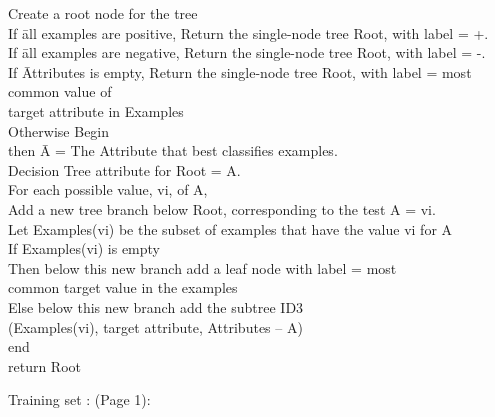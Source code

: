 \documentclass{report}
\begin{document}
\begin{tabbing}
Create a root node for the tree\\
If \= all examples are positive, Return the single-node tree Root, with label = +.\\
If \= all examples are negative, Return the single-node tree Root, with label = -.\\
If \= Attributes is empty, Return the single-node tree Root, with label = most common value of\\ target attribute in Examples\\
Otherwise Begin \\
\> then \=  A = The Attribute that best classifies examples.\\
\> Decision Tree attribute for Root = A.\\
\> For each possible value, vi, of A,\\
\> \> Add a new tree branch below Root, corresponding to the test A = vi.\\
\> \> Let Examples(vi) be the subset of examples that have the value vi for A\\
\> \> If Examples(vi) is empty\\
\> \> Then below this new branch add a leaf node with label = most\\
\> \> common target value in the examples\\
\> \> Else below this new branch add the subtree ID3 \\
\> \> (Examples(vi), target attribute, Attributes – {A})\\

end\\
return Root\\
\end{tabbing}

Training set : \cite{RuleInduction}(Page 1):
\end{document}
